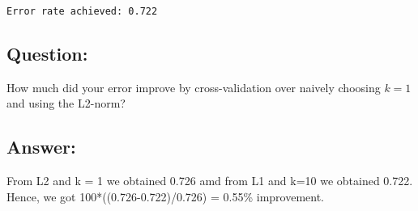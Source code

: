 \documentclass[11pt]{article}
\begin{document}
    \begin{Verbatim}[commandchars=\\\{\}]
Error rate achieved: 0.722

    \end{Verbatim}

    \hypertarget{question}{%
\subsection{Question:}\label{question}}

How much did your error improve by cross-validation over naively
choosing \(k=1\) and using the L2-norm?

    \hypertarget{answer}{%
\subsection{Answer:}\label{answer}}

From L2 and k = 1 we obtained 0.726 amd from L1 and k=10 we obtained
0.722. Hence, we got 100*((0.726-0.722)/0.726) = 0.55\% improvement.


    
    
    
    
\end{document}
